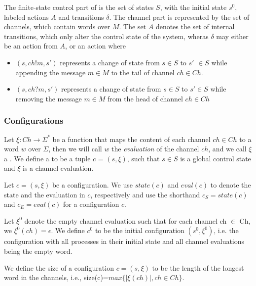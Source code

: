The finite-state control part of  is the set of states $S$, with the initial state $s^0$, labeled actions $A$ and transitions $\delta$. The channel part is represented by the set  of channels, which contain words over $M$. The set $A$ denotes the set of internal transitions, which only alter the control state of the system, wheras $\delta$ may either be an action from $A$, or an action where

\begin{itemize}
\item[]
$(s, ch!m, s')$ represents a change of state from $s \in S$ to $s'$ $\in S$ while appending the message $m\in M$ to the tail of channel $ch\in Ch$.
\item[]
$(s, ch?m, s')$ represents a change of state from $s\in S$ to $s'\in S$ while removing the message $m\in M$ from the head of channel $ch \in Ch$
\end{itemize}



\subsubsection{Configurations}
Let $\xi : Ch \rightarrow \Sigma^*$ be a function that maps the content of each channel $ch \in Ch$ to a word $w$ over $\Sigma$, then we will call $w$ the \emph{evaluation} of the channel $ch$, and we call $\xi$ a . We define a  to be a tuple $c$ = $(s, \xi)$, such that $s \in S$ is a global control state and $\xi$ is a channel evaluation.

Let $c=(s,\xi)$ be a configuration. We use $state(c)$ and $eval(c)$  to denote the state and the evaluation in $c$, respectively and use the shorthand $c_{S} = state(c)$ and $c_{E} = eval(c)$ for a configuration $c$.

Let $\xi^0$ denote the empty channel evaluation such that for each channel ch $\in$ Ch, we $\xi^0(ch)=\epsilon$. We define $c^0$ to be the initial configuration $(s^0, \xi^0)$, i.e. the configuration with all processes in their initial state and all channel evaluations being the empty word.

We define the size of a configuration $c = (s,\xi)$ to be the length of the longest word in the channels, i.e., size(c)=$max\{|\xi(ch)|, ch \in Ch\}$.

